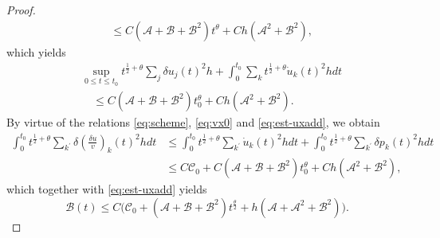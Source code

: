 \documentclass[10pt,a4paper]{amsart}
\begin{document}
\begin{proof}
\begin{equation}
\begin{aligned}
&\leq C(\mathscr{A}+\mathscr{B}+\mathscr{B}^2)t^{\theta}+C h(\mathscr{A}^2+\mathscr{B}^2),
\end{aligned}\end{equation}
which yields
\begin{equation}\label{eq:est-uxadd}\begin{aligned}
&\sup_{0\leq t\leq t_{0}}t^{\frac{1}{2}+\theta}\sum_{j}\delta u_{j}(t)^{2}h+\int_{0}^{t_0}\sum_{k}t^{\frac{1}{2}+\theta}\dot{u}_{k}(t)^{2}hdt\\
&\quad\leq C(\mathscr{A}+\mathscr{B}+\mathscr{B}^2)t_0^{\theta}+C h(\mathscr{A}^2+\mathscr{B}^2).
\end{aligned}\end{equation}
By virtue of the relations \eqref{eq:scheme},  \eqref{eq:vx0} and \eqref{eq:est-uxadd}, we obtain
\begin{equation*}
	\begin{aligned}
\int_{0}^{t_{0}}t^{\frac12+\theta}\sum\limits_{k^{\prime}}\delta\left(\frac{\delta u}{v}\right)_{k}(t)^{2}hdt&\leq \int_{0}^{t_{0}}t^{\frac12+\theta}\sum_{k^{\prime}}\dot{u}_{k}(t)^{2}hdt+\int_{0}^{t_{0}}t^{\frac12+\theta}\sum_{k^{\prime}}\delta p_{k}(t)^{2}hdt \\
&\leq C\mathscr{C}_0+C(\mathscr{A}+\mathscr{B}+\mathscr{B}^2)t_0^{\theta}+C h(\mathscr{A}^2+\mathscr{B}^2),
\end{aligned}
\end{equation*}
which together with \eqref{eq:est-uxadd} yields 
\begin{equation}\label{prop-ab}\mathscr{B}(t)\leq C\big(\mathscr{C}_0+(\mathscr{A}+\mathscr{B}+\mathscr{B}^2)t^{\frac{\theta}{2}}+ h(\mathscr{A}+\mathscr{A}^2+\mathscr{B}^2)\big).\end{equation}



\end{proof}
\end{document}
